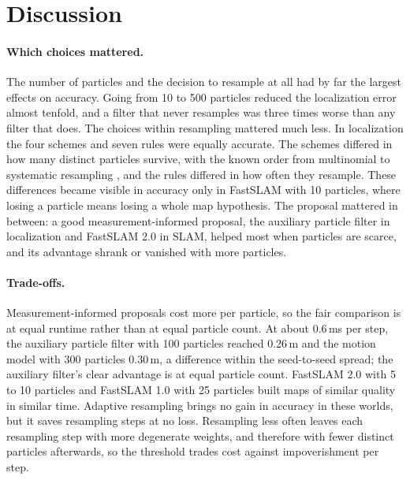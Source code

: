 \section{Discussion}\label{sec:discussion}

\paragraph{Which choices mattered.} The number of particles and the decision to resample at all had by far the largest
effects on accuracy. Going from 10 to 500 particles reduced the localization error almost tenfold, and a filter that never
resamples was three times worse than any filter that does. The choices within resampling mattered much less. In
localization the four schemes and seven rules were equally accurate. The schemes differed in how many distinct
particles survive, with the known order from multinomial to systematic resampling
\cite{douc2005comparison,hol2006resampling}, and the rules differed in how often they resample. These differences
became visible in accuracy only in FastSLAM with 10 particles, where losing a particle means losing a whole map
hypothesis. The proposal mattered in between: a good measurement-informed proposal, the auxiliary particle filter in
localization and FastSLAM 2.0 in SLAM, helped most when particles are scarce, and its advantage shrank or vanished with
more particles.

\paragraph{Trade-offs.} Measurement-informed proposals cost more per particle, so the fair comparison is at equal
runtime rather than at equal particle count. At about 0.6\,ms per step, the auxiliary particle filter with 100 particles
reached 0.26\,m and the motion model with 300 particles 0.30\,m, a difference within the seed-to-seed spread; the
auxiliary filter's clear advantage is at equal particle count. FastSLAM 2.0 with 5 to 10 particles and FastSLAM 1.0
with 25 particles built maps of similar quality in similar time. Adaptive resampling brings no gain in accuracy in these worlds, but it saves
resampling steps at no loss. Resampling less often leaves each resampling step with more degenerate weights, and
therefore with fewer distinct particles afterwards, so the threshold trades cost against impoverishment per step.


